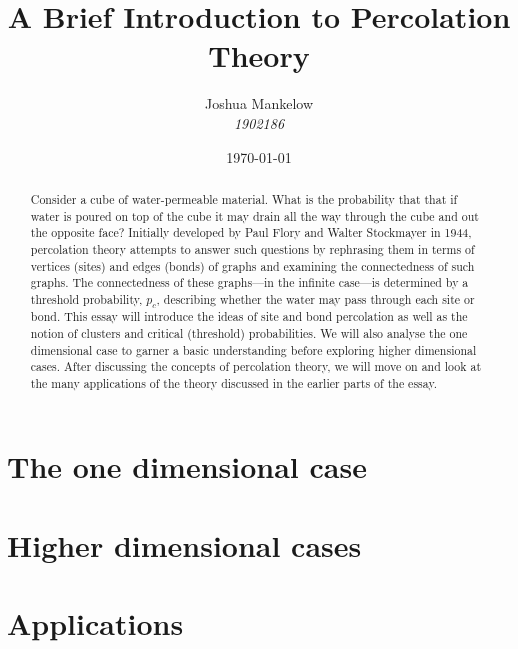 \documentclass[a4paper,11pt]{article}
\title{\textbf{ A Brief Introduction to Percolation Theory }}
\author{Joshua Mankelow \\ \textit{1902186}}
\date{\today}
\theoremstyle{plain} %
\theoremstyle{definition} %
\theoremstyle{remark} %
\begin{document}
  
\maketitle


\begin{abstract}
  Consider a cube of water-permeable material. What is the probability that that if water is poured on top of the cube it may drain all the way through
  the cube and out the opposite face? 
  Initially developed by Paul Flory and Walter Stockmayer in 1944, percolation theory attempts to answer such questions by rephrasing them
  in terms of vertices (sites) and edges (bonds) of graphs and examining the connectedness of such graphs. The connectedness of these graphs---in the infinite case---is
  determined by a threshold probability, $p_c$, describing whether the water may pass through each site or bond.
  This essay will introduce the ideas of site and bond percolation as well as the notion of clusters and critical (threshold) probabilities.
  We will also analyse the one dimensional case to garner a basic understanding before exploring higher dimensional cases. After discussing the concepts of percolation theory, we will move on and look at the many applications of the
  theory discussed in the earlier parts of the essay. 
\end{abstract}

\newpage

\tableofcontents

\newpage



\section{The one dimensional case}

\section{Higher dimensional cases}

\section{Applications}



\end{document}

